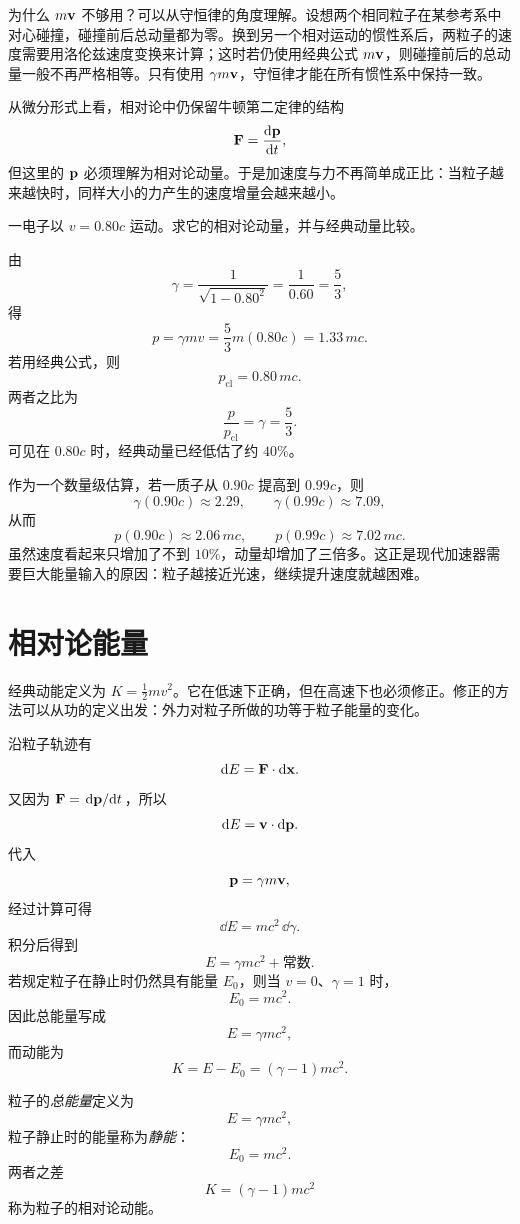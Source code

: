 为什么 $m\vb{v}$ 不够用？可以从守恒律的角度理解。设想两个相同粒子在某参考系中对心碰撞，碰撞前后总动量都为零。换到另一个相对运动的惯性系后，两粒子的速度需要用洛伦兹速度变换来计算；这时若仍使用经典公式 $m\vb{v}$，则碰撞前后的总动量一般不再严格相等。只有使用 $\gamma m\vb{v}$，守恒律才能在所有惯性系中保持一致。

从微分形式上看，相对论中仍保留牛顿第二定律的结构
\[
\vb{F}=\dv{\vb{p}}{t},
\]
但这里的 $\vb{p}$ 必须理解为相对论动量。于是加速度与力不再简单成正比：当粒子越来越快时，同样大小的力产生的速度增量会越来越小。

\begin{example}[高速电子的动量]
一电子以 $v=0.80c$ 运动。求它的相对论动量，并与经典动量比较。

由
\[
\gamma = \frac{1}{\sqrt{1-0.80^2}}=\frac{1}{0.60}=\frac53,
\]
得
\[
 p=\gamma mv = \frac53 m(0.80c)=1.33\,mc.
\]
若用经典公式，则
\[
 p_{\text{cl}}=0.80\,mc.
\]
两者之比为
\[
\frac{p}{p_{\text{cl}}}=\gamma=\frac53.
\]
可见在 $0.80c$ 时，经典动量已经低估了约 $40\%$。
\end{example}

作为一个数量级估算，若一质子从 $0.90c$ 提高到 $0.99c$，则
\[
\gamma(0.90c)\approx 2.29,
\qquad
\gamma(0.99c)\approx 7.09,
\]
从而
\[
 p(0.90c)\approx 2.06\,mc,
 \qquad
 p(0.99c)\approx 7.02\,mc.
\]
虽然速度看起来只增加了不到 $10\%$，动量却增加了三倍多。这正是现代加速器需要巨大能量输入的原因：粒子越接近光速，继续提升速度就越困难。

\section{相对论能量}

经典动能定义为 $K=\tfrac12 mv^2$。它在低速下正确，但在高速下也必须修正。修正的方法可以从功的定义出发：外力对粒子所做的功等于粒子能量的变化。

沿粒子轨迹有
\[
\dd E = \vb{F}\cdot \dd \vb{x}.
\]
又因为 $\vb{F}=\dv*{\vb{p}}{t}$，所以
\[
\dd E = \vb{v}\cdot \dd \vb{p}.
\]
代入
\[
\vb{p}=\gamma m\vb{v},
\]
经过计算可得
\[
\dd E = mc^2\,\dd \gamma.
\]
积分后得到
\[
E=\gamma mc^2 + \text{常数}.
\]
若规定粒子在静止时仍然具有能量 $E_0$，则当 $v=0$、$\gamma=1$ 时，
\[
E_0 = mc^2.
\]
因此总能量写成
\[
E=\gamma mc^2,
\]
而动能为
\[
K=E-E_0=(\gamma-1)mc^2.
\]

\begin{definition}[总能量与静能]
粒子的\emph{总能量}定义为
\[
E=\gamma mc^2,
\]
粒子静止时的能量称为\emph{静能}：
\[
E_0=mc^2.
\]
两者之差
\[
K=(\gamma-1)mc^2
\]
称为粒子的相对论动能。
\end{definition}

